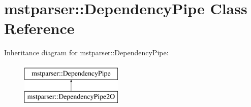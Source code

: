 \hypertarget{classmstparser_1_1DependencyPipe}{
\section{mstparser::DependencyPipe Class Reference}
\label{classmstparser_1_1DependencyPipe}
}
Inheritance diagram for mstparser::DependencyPipe:\begin{figure}[H]
\begin{center}
\leavevmode
\includegraphics[height=2cm]{classmstparser_1_1DependencyPipe}
\end{center}
\end{figure}

